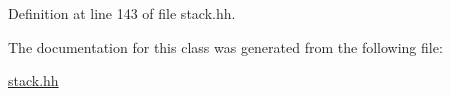 Definition at line 143 of file stack.\-hh.



The documentation for this class was generated from the following file\-:\begin{DoxyCompactItemize}
\item 
\hyperlink{stack_8hh}{stack.\-hh}\end{DoxyCompactItemize}
